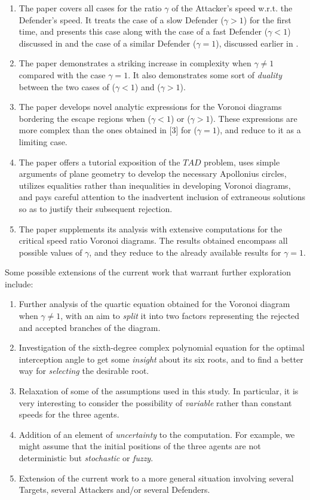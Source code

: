 \documentclass[final,5p,times,twocolumn]{elsarticle}
\begin{document}
\begin{enumerate}
\item The paper covers all cases for the ratio $\gamma$ of the Attacker's speed w.r.t. the Defender's speed. It treats the case of a slow Defender ($\gamma>1$) for the first time, and presents this case along with the case of a fast Defender ($\gamma<1$) discussed in \cite{garcia2015active} and the case of a similar Defender ($\gamma=1$), discussed earlier in \cite{pachter2014active,garcia2015escape}.
\item The paper demonstrates a striking increase in complexity when $\gamma\neq1$ compared with the case $\gamma=1$. It also demonstrates some sort of \textit{duality} between the two cases of ($\gamma<1$) and ($\gamma>1$).
\item The paper develops novel analytic expressions for the Voronoi diagrams bordering the escape regions when ($\gamma<1$) or ($\gamma>1$). These expressions are more complex than the ones obtained in [3] for ($\gamma=1$), and reduce to it as a limiting case.
\item The paper offers a tutorial exposition of the $TAD$ problem, uses simple arguments of plane geometry to develop the necessary Apollonius circles, utilizes equalities rather than inequalities in developing Voronoi diagrams, and pays careful attention to the inadvertent inclusion of extraneous solutions so as to justify their subsequent rejection.
\item The paper supplements its analysis with extensive computations for the critical speed ratio Voronoi diagrams. The results obtained encompass all possible values of $\gamma$, and they reduce to the already available results for $\gamma=1$.
\end{enumerate}  

Some possible extensions of the current work that warrant further exploration include:
\begin{enumerate}
\item Further analysis of the quartic equation obtained for the Voronoi diagram when $\gamma\neq1$, with an aim to \textit{split} it into two factors representing the rejected and accepted branches of the diagram.
\item Investigation of the sixth-degree complex polynomial equation for the optimal interception angle to get some \textit{insight} about its six roots, and to find a better way for \textit{selecting} the desirable root.
\item Relaxation of some of the assumptions used in this study. In particular, it is very interesting to consider the possibility of \textit{variable} rather than constant speeds for the three agents.
\item Addition of an element of \textit{uncertainty} to the computation. For example, we might assume that the initial positions of the three agents are not deterministic but \textit{stochastic} or \textit{fuzzy}.
\item Extension of the current work to a more general situation involving several Targets, several Attackers and/or several Defenders.     
\end{enumerate} 
\end{document}
